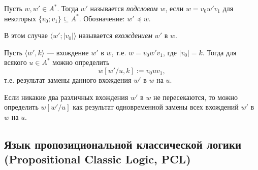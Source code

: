 \documentclass[12pt,a4paper]{article}
\begin{document}
    \begin{definition}
        Пусть $w, w' \in A^*$. Тогда $w'$ называется \emph{подсловом $w$}, если $w = v_0 w' v_1$ для некоторых $\{v_0; v_1\} \subseteq A^*$. Обозначение: $w' \preccurlyeq w$.

        В этом случае $\langle w'; |v_0|\rangle$ называется \emph{вхождением} $w'$ в $w$.
    \end{definition}

    \begin{definition}
        Пусть $\langle w', k\rangle$ --- вхождение $w'$ в $w$, т.е. $w = v_0 w' v_1$, где $|v_0| = k$. Тогда для всякого $u \in A^*$ можно определить
        \[w [w' / u, k] := v_0 u v_1,\]
        т.е. результат замены данного вхождения $w'$ в $w$ на $u$.
        
        Если никакие два различных вхождения $w'$ в $w$ не пересекаются, то можно определить $w [w' / u]$ как результат одновременной замены всех вхождений $w'$ в $w$ на $u$. 
    \end{definition}

    \subsection{Язык пропозициональной классической логики\\(Propositional Classic Logic, PCL)}
\end{document}
